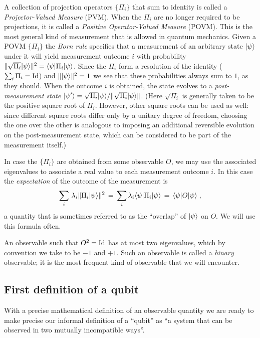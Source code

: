 A collection of projection operators $\{\Pi_i\}$ that sum to identity is called a \emph{Projector-Valued Measure} (PVM). When the $\Pi_i$ are no longer required to be projections, it is called a \emph{Positive Operator-Valued Measure} (POVM). This is the most general kind of measurement that is allowed in quantum mechanics. Given a POVM $\{\Pi_i\}$ the \emph{Born rule} specifies that a measurement of an arbitrary state $|\psi\rangle$ under it will yield measurement outcome $i$ with probability $\|\sqrt{\Pi_i} |\psi\rangle\|^2 = \langle\psi|\Pi_i |\psi\rangle$. Since the $\Pi_i$ form a resolution of the identity ($\sum_i \Pi_i=\mathop{\rm Id}\nolimits$) and $\||\psi\rangle\|^2=1$ we see that these probabilities always sum to $1$, as they should. When the outcome $i$ is obtained, the state evolves to a \emph{post-measurement state} $|\psi'\rangle = \sqrt{\Pi_i} |\psi\rangle /\| \sqrt{\Pi_i} |\psi\rangle\|$. (Here $\sqrt{\Pi_i}$ is generally taken to be the positive square root of $\Pi_i$. However, other square roots can be used as well: since different square roots differ only by a unitary degree of freedom, choosing the one over the other is analogous to imposing an additional reversible evolution on the post-measurement state, which can be considered to be part of the measurement itself.)

In case the $\{\Pi_i\}$ are obtained from some observable $O$, we may use the associated eigenvalues to associate a real value to each measurement outcome $i$. In this case the \emph{expectation} of the outcome of the measurement is 
\[ \sum_i \,\lambda_i \|\Pi_i |\psi\rangle\|^2 \,=\, \sum_i \lambda_i \langle\psi| \Pi_i |\psi\rangle \,=\, \langle\psi| O |\psi\rangle\;,\]
a quantity that is sometimes referred to as the ``overlap'' of $|\psi\rangle$ on $O$. We will use this formula often. 

An observable such that $O^2=\mathop{\rm Id}\nolimits$ has at most two eigenvalues, which by convention we take to be $-1$ and $+1$. Such an observable is called a \emph{binary} observable; it is the most frequent kind of observable that we will encounter. 

\subsection{First definition of a qubit}

With a precise mathematical definition of an observable quantity we are ready to make precise our informal definition of a ``qubit'' as ``a system that can be observed in two mutually incompatible ways''. 

